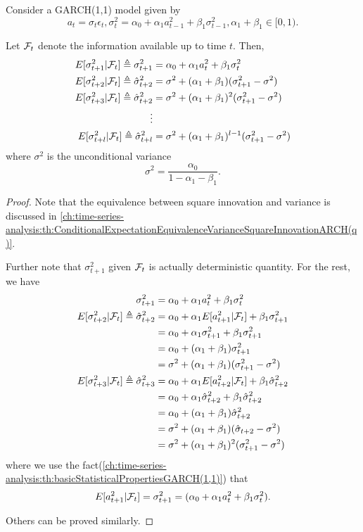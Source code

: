\begin{theorem}
Consider a GARCH(1,1) model given by
$$a_t = \sigma_t \epsilon_t, \sigma_t^2 = \alpha_0 + \alpha_1a_{t-1}^2 + \beta_1\sigma_{t-1}^2,\alpha_1+\beta_1\in [0,1).$$

	
	Let $\mathcal{F}_t$ denote the information available up to time $t$. Then,
	\begin{align*}
	E[\sigma_{t+1}^2|\mathcal{F}_t]\triangleq \sigma_{t+1}^2 
	&=\alpha_0 + \alpha_1 a_{t}^2  + \beta_1 \sigma_{t}^2\\
	E[\sigma_{t+2}^2|\mathcal{F}_t]\triangleq \hat{\sigma}_{t+2}^2 
	&=\sigma^2 + (\alpha_1+ \beta_1)(\sigma_{t+1}^2 - \sigma^2)\\
	E[\sigma_{t+3}^2|\mathcal{F}_t]\triangleq \hat{\sigma}_{t+2}^2 &= \sigma^2 + (\alpha_1+ \beta_1)^2(\sigma_{t+1}^2 - \sigma^2)\\
	\vdots & \\
	E[\sigma_{t+l}^2|\mathcal{F}_t]\triangleq\hat{\sigma}_{t+l}^2 &= \sigma^2 + (\alpha_1+ \beta_1)^{l-1}(\sigma_{t+1}^2 - \sigma^2)
	\end{align*}
where $\sigma^2$ is the unconditional variance $$\sigma^2 = \frac{\alpha_0}{1 - \alpha_1 - \beta_1}.$$	
\end{theorem}
\begin{proof}
Note that the equivalence between square innovation and variance is discussed in \autoref{ch:time-series-analysis:th:ConditionalExpectationEquivalenceVarianceSquareInnovationARCH(q)}.

Further note that $\sigma_{t+1}^2$ given $\mathcal{F}_t$ is actually deterministic quantity. For the rest, we have
\begin{align*}
\sigma_{t+1}^2 &= \alpha_0 + \alpha_1 a_{t}^2  + \beta_1 \sigma_{t}^2 \\
E[\sigma_{t+2}^2|\mathcal{F}_t]\triangleq \hat{\sigma}_{t+2}^2 &= \alpha_0 + \alpha_1 E[a_{t+1}^2|\mathcal{F}_{t}] + \beta_1 \sigma_{t+1}^2 \\
&=\alpha_0 + \alpha_1\sigma_{t+1}^2 + \beta_1\sigma_{t+1}^2\\
&=\alpha_0 + (\alpha_1+ \beta_1)\sigma_{t+1}^2\\
&=\sigma^2 + (\alpha_1+ \beta_1)(\sigma_{t+1}^2 - \sigma^2)\\
E[\sigma_{t+3}^2|\mathcal{F}_t]\triangleq \hat{\sigma}_{t+3}^2 &= \alpha_0 + \alpha_1 E[a_{t+2}^2|\mathcal{F}_{t}] + \beta_1 \hat{\sigma}_{t+2}^2 \\
&=\alpha_0 + \alpha_1 \hat{\sigma}_{t+2}^2 + \beta_1\hat{\sigma}_{t+2}^2\\
&=\alpha_0 + (\alpha_1+ \beta_1)\hat{\sigma}_{t+2}^2\\
&=\sigma^2 + (\alpha_1+ \beta_1)(\hat{\sigma}_{t+2}-\sigma^2)\\
&=\sigma^2 + (\alpha_1+ \beta_1)^2(\sigma_{t+1}^2 - \sigma^2)
\end{align*}	
where we use the fact(\autoref{ch:time-series-analysis:th:basicStatisticalPropertiesGARCH(1,1)}) that
	$$E[a_{t+1}^2|\mathcal{F}_{t}] = \sigma_{t+1}^2 = (\alpha_0 + \alpha_1 a_{t}^2 + \beta_1 \sigma_{t}^2).$$

Others can be proved similarly.
\end{proof}

